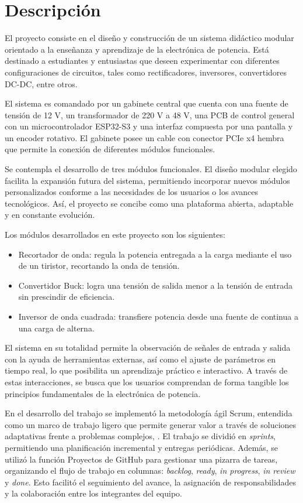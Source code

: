 \section{Descripción}
\justifying

El proyecto consiste en el diseño y construcción de un sistema didáctico modular orientado a la enseñanza y aprendizaje de la electrónica de potencia. Está destinado a estudiantes y entusiastas que deseen experimentar con diferentes configuraciones de circuitos, tales como rectificadores, inversores, convertidores DC-DC, entre otros.

El sistema es comandado por un gabinete central que cuenta con una fuente de tensión de 12 V, un transformador de 220 V a 48 V, una PCB de control general con un microcontrolador ESP32-S3 y una interfaz compuesta por una pantalla y un encoder rotativo. El gabinete posee un cable con conector PCIe x4 hembra que permite la conexión de diferentes módulos funcionales. 

Se contempla el desarrollo de tres módulos funcionales. El diseño modular elegido facilita la expansión futura del sistema, permitiendo incorporar nuevos módulos personalizados conforme a las necesidades de los usuarios o los avances tecnológicos. Así, el proyecto se concibe como una plataforma abierta, adaptable y en constante evolución.

Los módulos desarrollados en este proyecto son los siguientes:
\begin{itemize}[noitemsep]
    \item Recortador de onda: regula la potencia entregada a la carga mediante el uso de un tiristor, recortando la onda de tensión. 
    \item Convertidor Buck: logra una tensión de salida menor a la tensión de entrada sin prescindir de eficiencia.
    \item Inversor de onda cuadrada: transfiere potencia desde una fuente de continua a una carga de alterna.
\end{itemize}

El sistema en su totalidad permite la observación de señales de entrada y salida con la ayuda de herramientas externas, así como el ajuste de parámetros en tiempo real, lo que posibilita un aprendizaje práctico e interactivo. A través de estas interacciones, se busca que los usuarios comprendan de forma tangible los principios fundamentales de la electrónica de potencia.

En el desarrollo del trabajo se implementó la metodología ágil Scrum, entendida como un marco de trabajo ligero que permite generar valor a través de soluciones adaptativas frente a problemas complejos, \parencite{SCRUM-GUIDE}. El trabajo se dividió en \textit{sprints}, permitiendo una planificación incremental y entregas periódicas. Además, se utilizó la función Proyectos de GitHub para gestionar una pizarra de tareas, organizando el flujo de trabajo en columnas: \textit{backlog}, \textit{ready}, \textit{in progress}, \textit{in review} y \textit{done}. Esto facilitó el seguimiento del avance, la asignación de responsabilidades y la colaboración entre los integrantes del equipo.
